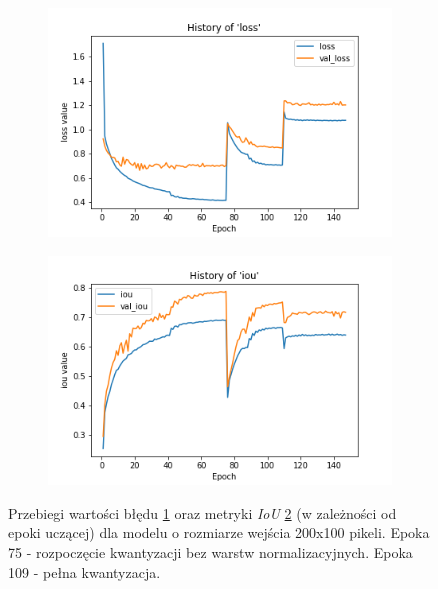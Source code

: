 \begin{figure}
     \centering
     \begin{subfigure}[b]{0.49\textwidth}
         \centering
         \includegraphics[width=\textwidth]{images/LN_smaller_hist_of_loss.png}
         \caption{}
         \label{fig:small_loss}
     \end{subfigure}
     \hfill
     \begin{subfigure}[b]{0.49\textwidth}
         \centering
         \includegraphics[width=\textwidth]{images/LN_smaller_hist_of_iou.png}
         \caption{}
         \label{fig:small_iou}
     \end{subfigure}
     
    \caption{Przebiegi wartości błędu \ref{fig:small_loss} oraz metryki \emph{IoU} \ref{fig:small_iou} (w zależności od epoki uczącej) dla modelu o rozmiarze wejścia 200x100 pikeli.
    Epoka 75 - rozpoczęcie kwantyzacji bez warstw normalizacyjnych. Epoka 109 - pełna kwantyzacja.}
    \label{fig:three_step_train}
\end{figure}


